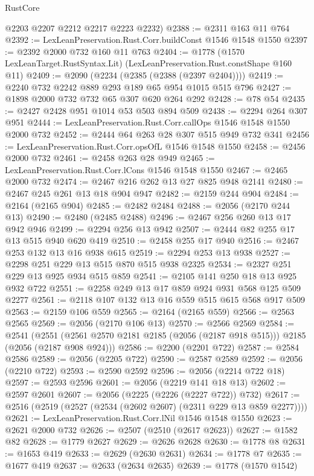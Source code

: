 \begin{lexlean}{RustCore}
\begin{coremodule}
      @2203
      @2207
      @2212
      @2217
      @2223
      @2232)
@2388 := @2311 @163 @11 @764
@2392 := LexLeanPreservation.Rust.Corr.buildConst @1546 @1548 @1550
@2397 := @2392 @2000 @732 @160 @11 @763
@2404 := @1778 (@1570 LexLeanTarget.RustSyntax.Lit) (LexLeanPreservation.Rust.constShape @160 @11)
@2409 := @2090 (@2234 (@2385 (@2388 (@2397 @2404))))
@2419 := @2240 @732 @2242 @889 @293 @189 @65 @954 @1015 @515 @796
@2427 := @1898 @2000 @732 @732 @65 @307 @620 @264 @292
@2428 := @78 @54
@2435 := @2427 @2428 @951 @1014 @53 @503 @894 @509
@2438 := @2294 @264 @307 @951
@2444 := LexLeanPreservation.Rust.Corr.callOps @1546 @1548 @1550 @2000 @732
@2452 := @2444 @64 @263 @28 @307 @515 @949 @732 @341
@2456 := LexLeanPreservation.Rust.Corr.opsOfL @1546 @1548 @1550
@2458 := @2456 @2000 @732
@2461 := @2458 @263 @28 @949
@2465 := LexLeanPreservation.Rust.Corr.lCons @1546 @1548 @1550
@2467 := @2465 @2000 @732
@2474 := @2467 @216 @262 @13 @27 @825 @948 @2141
@2480 := @2467 @245 @261 @13 @18 @904 @947
@2482 := @2159 @244 @904
@2484 := @2164 (@2165 @904)
@2485 := @2482 @2484
@2488 := @2056 (@2170 @244 @13)
@2490 := @2480 (@2485 @2488)
@2496 := @2467 @256 @260 @13 @17 @942 @946
@2499 := @2294 @256 @13 @942
@2507 := @2444 @82 @255 @17 @13 @515 @940 @620 @419
@2510 := @2458 @255 @17 @940
@2516 := @2467 @253 @132 @13 @16 @938 @615
@2519 := @2294 @253 @13 @938
@2527 := @2298 @251 @229 @13 @515 @870 @515 @938 @2325
@2534 := @2327 @251 @229 @13 @925 @934 @515 @859
@2541 := @2105 @141 @250 @18 @13 @925 @932 @722
@2551 := @2258 @249 @13 @17 @859 @924 @931 @568 @125 @509 @2277
@2561 := @2118 @107 @132 @13 @16 @559 @515 @615 @568 @917 @509
@2563 := @2159 @106 @559
@2565 := @2164 (@2165 @559)
@2566 := @2563 @2565
@2569 := @2056 (@2170 @106 @13)
@2570 := @2566 @2569
@2584 := @2541
    (@2551 (@2561 @2570 @2181 @2185 (@2056 (@2187 @918 @515))) @2185 (@2056 (@2187 @908 @924)))
@2586 := @2200 (@2201 @722)
@2587 := @2584 @2586
@2589 := @2056 (@2205 @722)
@2590 := @2587 @2589
@2592 := @2056 (@2210 @722)
@2593 := @2590 @2592
@2596 := @2056 (@2214 @722 @18)
@2597 := @2593 @2596
@2601 := @2056 (@2219 @141 @18 @13)
@2602 := @2597 @2601
@2607 := @2056 (@2225 (@2226 (@2227 @722)) @732)
@2617 := @2516 (@2519 (@2527 (@2534 (@2602 @2607) (@2311 @229 @13 @859 @2277))))
@2621 := LexLeanPreservation.Rust.Corr.lNil @1546 @1548 @1550
@2623 := @2621 @2000 @732
@2626 := @2507 (@2510 (@2617 @2623))
@2627 := @1582 @82
@2628 := @1779 @2627
@2629 := @2626 @2628
@2630 := @1778 @8
@2631 := @1653 @419
@2633 := @2629 (@2630 @2631)
@2634 := @1778 @7
@2635 := @1677 @419
@2637 := @2633 (@2634 @2635)
@2639 := @1778 (@1570 @1542)

\end{coremodule}
\end{lexlean}
